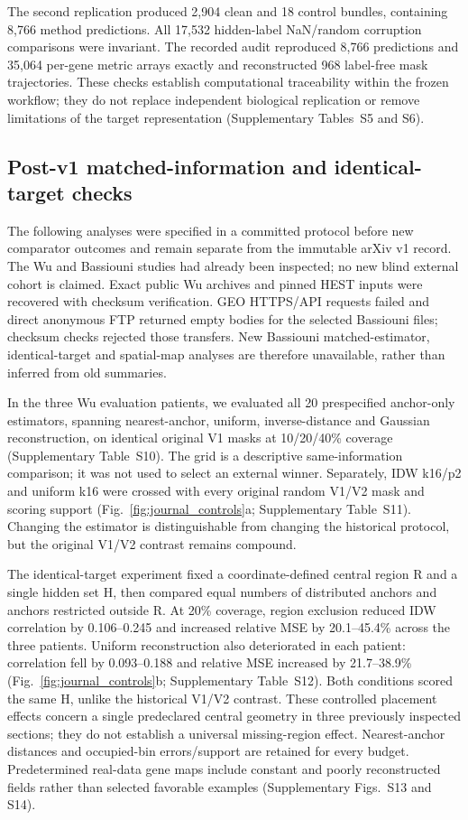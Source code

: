 The second replication produced 2,904 clean and 18 control bundles, containing 8,766 method predictions. All 17,532 hidden-label NaN/random corruption comparisons were invariant. The recorded audit reproduced 8,766 predictions and 35,064 per-gene metric arrays exactly and reconstructed 968 label-free mask trajectories. These checks establish computational traceability within the frozen workflow; they do not replace independent biological replication or remove limitations of the target representation (Supplementary Tables~S5 and S6).


\subsection{Post-v1 matched-information and identical-target checks}
The following analyses were specified in a committed protocol before new comparator outcomes and remain separate from the immutable arXiv v1 record. The Wu and Bassiouni studies had already been inspected; no new blind external cohort is claimed. Exact public Wu archives and pinned HEST inputs were recovered with checksum verification. GEO HTTPS/API requests failed and direct anonymous FTP returned empty bodies for the selected Bassiouni files; checksum checks rejected those transfers. New Bassiouni matched-estimator, identical-target and spatial-map analyses are therefore unavailable, rather than inferred from old summaries.

In the three Wu evaluation patients, we evaluated all 20 prespecified anchor-only estimators, spanning nearest-anchor, uniform, inverse-distance and Gaussian reconstruction, on identical original V1 masks at 10/20/40\% coverage (Supplementary Table~S10). The grid is a descriptive same-information comparison; it was not used to select an external winner. Separately, IDW k16/p2 and uniform k16 were crossed with every original random V1/V2 mask and scoring support (Fig.~\ref{fig:journal_controls}a; Supplementary Table~S11). Changing the estimator is distinguishable from changing the historical protocol, but the original V1/V2 contrast remains compound.

The identical-target experiment fixed a coordinate-defined central region R and a single hidden set H, then compared equal numbers of distributed anchors and anchors restricted outside R. At 20\% coverage, region exclusion reduced IDW correlation by 0.106--0.245 and increased relative MSE by 20.1--45.4\% across the three patients. Uniform reconstruction also deteriorated in each patient: correlation fell by 0.093--0.188 and relative MSE increased by 21.7--38.9\% (Fig.~\ref{fig:journal_controls}b; Supplementary Table~S12). Both conditions scored the same H, unlike the historical V1/V2 contrast. These controlled placement effects concern a single predeclared central geometry in three previously inspected sections; they do not establish a universal missing-region effect. Nearest-anchor distances and occupied-bin errors/support are retained for every budget. Predetermined real-data gene maps include constant and poorly reconstructed fields rather than selected favorable examples (Supplementary Figs.~S13 and S14).

